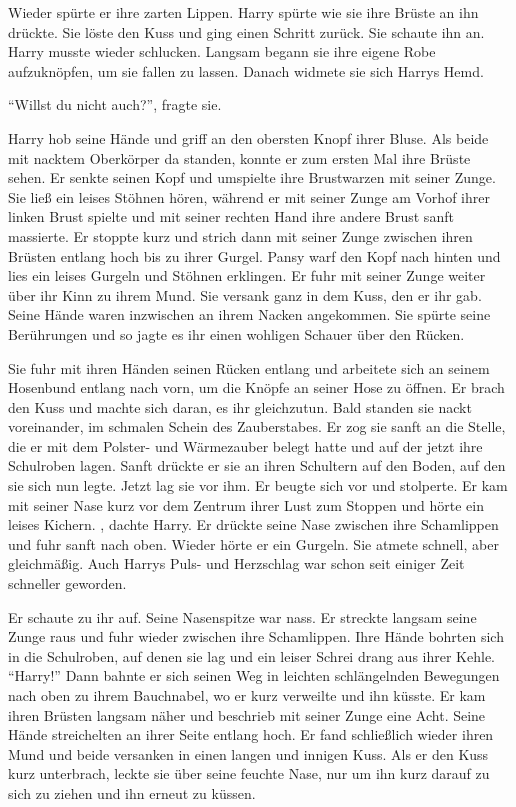 \begin{abAchtzehn}

Wieder spürte er ihre zarten Lippen. Harry spürte  wie sie ihre Brüste an ihn drückte. Sie löste den Kuss und ging einen Schritt zurück. Sie schaute ihn an. Harry musste wieder schlucken. Langsam begann sie ihre eigene Robe aufzuknöpfen, um sie fallen zu lassen. Danach widmete sie sich Harrys Hemd.

\enquote{Willst du nicht auch?}, fragte sie.

Harry hob seine Hände und griff an den obersten Knopf ihrer Bluse. Als beide mit nacktem Oberkörper da standen, konnte er zum ersten Mal ihre Brüste sehen. Er senkte seinen Kopf und umspielte ihre Brustwarzen mit seiner Zunge. Sie ließ ein leises Stöhnen hören, während er mit seiner Zunge am Vorhof ihrer linken Brust spielte und mit seiner rechten Hand ihre andere Brust sanft massierte. Er stoppte kurz und strich dann mit seiner Zunge zwischen ihren Brüsten entlang hoch bis zu ihrer Gurgel. Pansy warf den Kopf nach hinten und lies ein leises Gurgeln und Stöhnen erklingen. Er fuhr mit seiner Zunge weiter über ihr Kinn zu ihrem Mund. Sie versank ganz in dem Kuss, den er ihr gab. Seine Hände waren inzwischen an ihrem Nacken angekommen. Sie spürte seine Berührungen und so jagte es ihr einen wohligen Schauer über den Rücken.

Sie fuhr mit ihren Händen seinen Rücken entlang und arbeitete sich an seinem Hosenbund entlang nach vorn, um die Knöpfe an seiner Hose zu öffnen. Er brach den Kuss und machte sich daran, es ihr gleichzutun. Bald standen sie nackt voreinander, im schmalen Schein des Zauberstabes. Er zog sie sanft an die Stelle, die er mit dem Polster- und Wärmezauber belegt hatte und auf der jetzt ihre Schulroben lagen. Sanft drückte er sie an ihren Schultern auf den Boden, auf den sie sich nun legte. Jetzt lag sie vor ihm. Er beugte sich vor und stolperte. Er kam mit seiner Nase kurz vor dem Zentrum ihrer Lust zum Stoppen und hörte ein leises Kichern. , dachte Harry. Er drückte seine Nase zwischen ihre Schamlippen und fuhr sanft nach oben. Wieder hörte er ein Gurgeln. Sie atmete schnell, aber gleichmäßig. Auch Harrys Puls- und Herzschlag war schon seit einiger Zeit schneller geworden.

Er schaute zu ihr auf. Seine Nasenspitze war nass. Er streckte langsam seine Zunge raus und fuhr wieder zwischen ihre Schamlippen. Ihre Hände bohrten sich in die Schulroben, auf denen sie lag und ein leiser Schrei drang aus ihrer Kehle. \enquote{Harry!} Dann bahnte er sich seinen Weg in leichten schlängelnden Bewegungen nach oben zu ihrem Bauchnabel, wo er kurz verweilte und ihn küsste. Er kam ihren Brüsten langsam näher und beschrieb mit seiner Zunge eine Acht. Seine Hände streichelten an ihrer Seite entlang hoch. Er fand schließlich wieder ihren Mund und beide versanken in einen langen und innigen Kuss. Als er den Kuss kurz unterbrach, leckte sie über seine feuchte Nase, nur um ihn kurz darauf zu sich zu ziehen und ihn erneut zu küssen.

\end{abAchtzehn}

